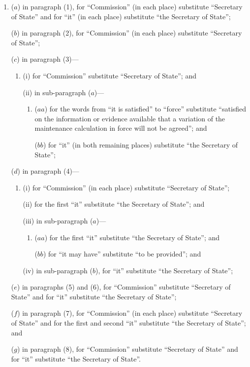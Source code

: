 \documentclass[12pt,a4paper]{article}
\begin{document}
\begin{enumerate}\item[]
($a$) in paragraph (1), for “Commission” (in each place) substitute “Secretary of State” and for “it” (in each place) substitute “the Secretary of State”;

($b$) in paragraph (2), for “Commission” (in each place) substitute “Secretary of State”;

($c$) in paragraph (3)—
\begin{enumerate}\item[]
(i)  for “Commission” substitute “Secretary of State”; and

(ii) in sub-paragraph ($a$)—
\begin{enumerate}\item[]
($aa$) for the words from “it is satisfied” to “force” substitute “satisfied on the information or evidence available that a variation of the maintenance calculation in force will not be agreed”; and

($bb$) for “it” (in both remaining places) substitute “the Secretary of State”;
\end{enumerate}
\end{enumerate}

($d$) in paragraph (4)—
\begin{enumerate}\item[]
(i)  for “Commission” (in each place) substitute “Secretary of State”;

(ii) for the first “it” substitute “the Secretary of State”; and

(iii) in sub-paragraph ($a$)—
\begin{enumerate}\item[]
($aa$) for the first “it” substitute “the Secretary of State”; and

($bb$) for “it may have” substitute “to be provided”; and
\end{enumerate}

(iv) in sub-paragraph ($b$), for “it” substitute “the Secretary of State”;
\end{enumerate}

($e$) in paragraphs (5) and (6), for “Commission” substitute “Secretary of State” and for “it” substitute “the Secretary of State”;

($f$) in paragraph (7), for “Commission” (in each place) substitute “Secretary of State” and for the first and second “it” substitute “the Secretary of State”; and

($g$) in paragraph (8), for “Commission” substitute “Secretary of State” and for “it” substitute “the Secretary of State”.
\end{enumerate}
\end{document}
